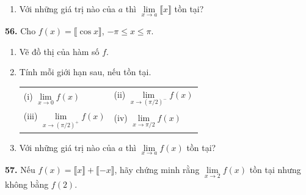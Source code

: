 \begin{minipage}[t]{0.485\textwidth}
\begin{enumerate}[label=\textnormal{(\alph*)}, nosep, leftmargin=1.5em]
    \begin{tabularx}{\linewidth}{@{}XX@{}}
    (i) $\lim\limits_{x \to n^-} \llbracket x \rrbracket$ & (ii) $\lim\limits_{x \to n^+} \llbracket x \rrbracket$
    \end{tabularx}
    \vspace{1pt}
    \item Với những giá trị nào của $a$ thì $\lim\limits_{x \to a} \llbracket x \rrbracket$ tồn tại?
\end{enumerate}

\vspace{6pt}
\textbf{56.} Cho $f(x) = \llbracket \cos x \rrbracket$, $-\pi \le x \le \pi$.
\begin{enumerate}[label=\textnormal{(\alph*)}, nosep, leftmargin=1.5em]
    \item Vẽ đồ thị của hàm số $f$.
    \item Tính mỗi giới hạn sau, nếu tồn tại.
    \vspace{1pt}
    
    \begin{tabularx}{\linewidth}{@{}XX@{}}
    (i) $\lim\limits_{x \to 0} f(x)$ & (ii) $\lim\limits_{x \to (\pi/2)^-} f(x)$ \\[4pt]
    (iii) $\lim\limits_{x \to (\pi/2)^+} f(x)$ & (iv) $\lim\limits_{x \to \pi/2} f(x)$
    \end{tabularx}
    \vspace{1pt}
    \item Với những giá trị nào của $a$ thì $\lim\limits_{x \to a} f(x)$ tồn tại?
\end{enumerate}

\vspace{6pt}
\textbf{57.} Nếu $f(x) = \llbracket x \rrbracket + \llbracket -x \rrbracket$, hãy chứng minh rằng $\lim\limits_{x \to 2} f(x)$ tồn tại nhưng không bằng $f(2)$.

\end{minipage}%
\hfill
